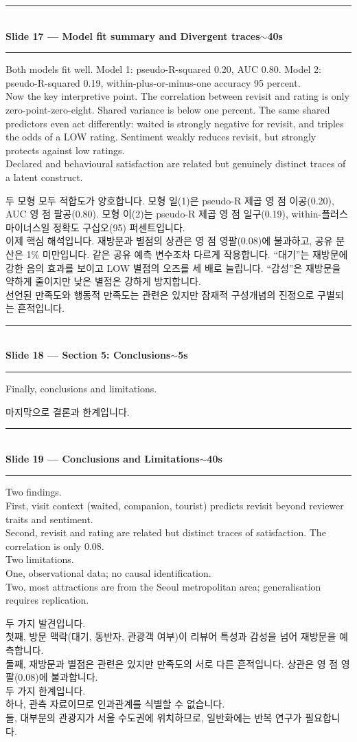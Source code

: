 \documentclass[10pt,a4paper]{article}
\newcommand{\sechead}[2]{%
  \vspace{6pt}%
  \noindent\rule{\linewidth}{0.6pt}\\[1pt]
  {\small\bfseries #1\hfill #2}\\[-3pt]
  \rule{\linewidth}{0.4pt}\par\vspace{2pt}%
}
\newcommand{\sent}[1]{#1\\[4pt]}
\newcommand{\bilingual}[2]{%
  \noindent%
  \begin{minipage}[t]{0.485\linewidth}
    \small #1
  \end{minipage}\hfill\vrule\hfill%
  \begin{minipage}[t]{0.483\linewidth}
    \small #2
  \end{minipage}\par\vspace{3pt}%
}
\begin{document}
\sechead{Slide 17 --- Model fit summary and Divergent traces}{$\sim$40s}

\bilingual{%
\sent{Both models fit well. Model 1: pseudo-R-squared 0.20, AUC 0.80.
Model 2: pseudo-R-squared 0.19, within-plus-or-minus-one accuracy 95
percent.}
\sent{Now the key interpretive point. The correlation between revisit
and rating is only zero-point-zero-eight. Shared variance is below one
percent. The same shared predictors even act differently: waited is
strongly negative for revisit, and triples the odds of a LOW rating.
Sentiment weakly reduces revisit, but strongly protects against low
ratings.}
\sent{Declared and behavioural satisfaction are related but genuinely
distinct traces of a latent construct.}
}{%
\sent{두 모형 모두 적합도가 양호합니다. 모형 일(1)은 pseudo-R 제곱 영 점
이공(0.20), AUC 영 점 팔공(0.80). 모형 이(2)는 pseudo-R 제곱 영 점
일구(0.19), within-플러스마이너스일 정확도 구십오(95) 퍼센트입니다.}
\sent{이제 핵심 해석입니다. 재방문과 별점의 상관은 영 점 영팔(0.08)에
불과하고, 공유 분산은 1\% 미만입니다. 같은 공유 예측 변수조차 다르게
작용합니다. ``대기''는 재방문에 강한 음의 효과를 보이고 LOW 별점의
오즈를 세 배로 늘립니다. ``감성''은 재방문을 약하게 줄이지만 낮은
별점은 강하게 방지합니다.}
\sent{선언된 만족도와 행동적 만족도는 관련은 있지만 잠재적 구성개념의
진정으로 구별되는 흔적입니다.}
}

\sechead{Slide 18 --- Section 5: Conclusions}{$\sim$5s}

\bilingual{%
\sent{Finally, conclusions and limitations.}
}{%
\sent{마지막으로 결론과 한계입니다.}
}

\sechead{Slide 19 --- Conclusions and Limitations}{$\sim$40s}

\bilingual{%
\sent{Two findings.}
\sent{First, visit context (waited, companion, tourist) predicts revisit
beyond reviewer traits and sentiment.}
\sent{Second, revisit and rating are related but distinct traces of
satisfaction. The correlation is only 0.08.}
\sent{Two limitations.}
\sent{One, observational data; no causal identification.}
\sent{Two, most attractions are from the Seoul metropolitan area;
generalisation requires replication.}
}{%
\sent{두 가지 발견입니다.}
\sent{첫째, 방문 맥락(대기, 동반자, 관광객 여부)이 리뷰어 특성과 감성을
넘어 재방문을 예측합니다.}
\sent{둘째, 재방문과 별점은 관련은 있지만 만족도의 서로 다른 흔적입니다.
상관은 영 점 영팔(0.08)에 불과합니다.}
\sent{두 가지 한계입니다.}
\sent{하나, 관측 자료이므로 인과관계를 식별할 수 없습니다.}
\sent{둘, 대부분의 관광지가 서울 수도권에 위치하므로, 일반화에는 반복
연구가 필요합니다.}
}
\end{document}
